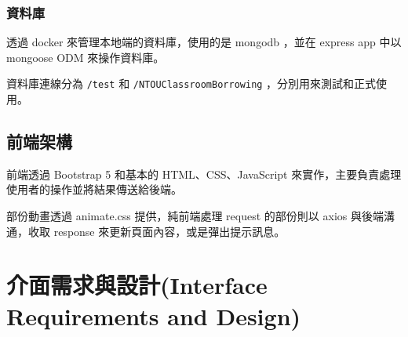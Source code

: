 \documentclass{article}
\begin{document}
\subsubsection{資料庫}

透過 docker 來管理本地端的資料庫，使用的是 mongodb ，並在 express app 中以 mongoose ODM 來操作資料庫。

資料庫連線分為 \verb|/test| 和 \verb|/NTOUClassroomBorrowing| ，分別用來測試和正式使用。

\subsection{前端架構}

前端透過 Bootstrap 5 和基本的 HTML、CSS、JavaScript 來實作，主要負責處理使用者的操作並將結果傳送給後端。

部份動畫透過 animate.css 提供，純前端處理 request 的部份則以 axios 與後端溝通，收取 response 來更新頁面內容，或是彈出提示訊息。

\newpage

\section[介面需求與設計(INTERFACE REQUIREMENTS AND DESIGN)]{介面需求與設計(Interface Requirements and Design)}

\newcommand{\IRTable}[6]{
	\begin{tabularx}{0.95\textwidth}{|c|Y|Y|}
		\hline
		\rowcolor{LightGray} 介面名稱              & 介面提供者                & 介面使用者                 \\
		\rowcolor{LightGray} (Interface Name)  & (Interface Provider) & (Interface Consumer)  \\ \hline
		#1                                     & #2                   & #3                    \\ \hline
		\rowcolor{LightGray} 連結方式              & 輸入資料                 & 輸出資料                  \\
		\rowcolor{LightGray} (Connection Type) & (Input Data)         & (Output Data)         \\ \hline
		\texttt{#4}                            & \usebox\jsoninputbox & \usebox\jsonoutputbox \\ \hline
		\rowcolor{LightGray} \multicolumn{3}{|c|}{ URL }                                      \\ \hline
		\multicolumn{3}{|c|}{\texttt{#5}}                                                     \\ \hline
		\rowcolor{LightGray} \multicolumn{3}{|c|}{  介面描述 (Interface Description) }            \\ \hline
		\multicolumn{3}{|c|}{#6}                                                              \\ \hline
	\end{tabularx}
}
\end{document}
